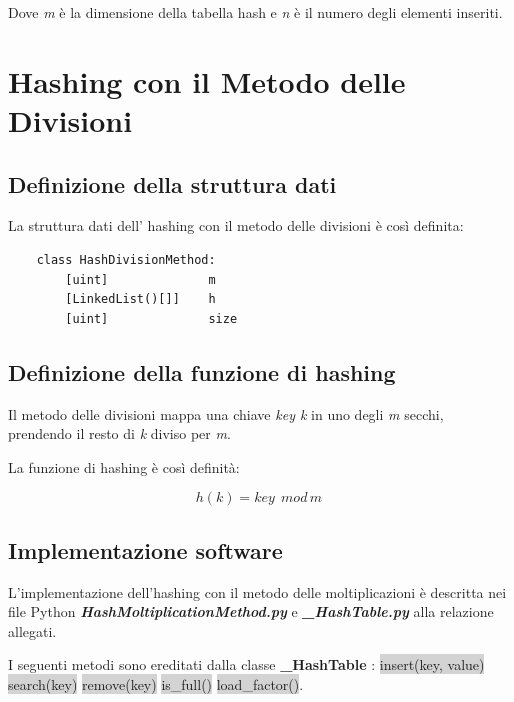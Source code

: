 \documentclass{article}
\begin{document}
		Dove \textit{m} è la dimensione della tabella hash e \textit{n} è il numero degli elementi inseriti.

	\newpage
	\section{Hashing con il Metodo delle Divisioni}
	
		\subsection{Definizione della struttura dati}
			La struttura dati dell' hashing con il metodo delle divisioni è così definita:

			\begin{lstlisting}
    class HashDivisionMethod:
        [uint]              m
        [LinkedList()[]]    h
        [uint]              size
			\end{lstlisting}

		\subsection{Definizione della funzione di hashing}
			Il metodo delle divisioni mappa una chiave \textit{key k} in uno degli \textit{m} secchi, prendendo il resto di \textit{k} diviso per \textit{m}.
		
			La funzione di hashing è così definità:

			\[ h(k) = key \ \ mod \, m \, \]



		\subsection{Implementazione software}
			L'implementazione dell'hashing con il metodo delle moltiplicazioni è descritta nei file Python \textbf{\textit{HashMoltiplicationMethod.py}} e \textbf{\textit{\_HashTable.py}} alla relazione allegati.
			
			I seguenti metodi sono ereditati dalla classe \textbf{\_HashTable} :
			\newline
			\colorbox{lightgray}{insert(key, value)} \colorbox{lightgray}{search(key)} \colorbox{lightgray}{remove(key)} \colorbox{lightgray}{is\_full()} \colorbox{lightgray}{load\_factor()}.
			
\end{document}

